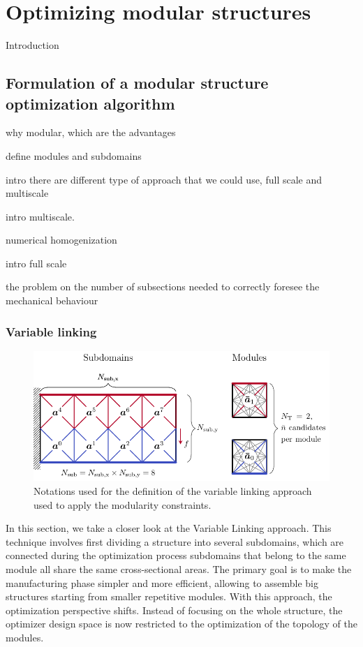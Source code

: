 \setchapterpreamble[u]{\margintoc}
\glsresetall %
\chapter{Optimizing modular structures}
Introduction
\section{Formulation of a modular structure optimization algorithm}
why modular, which are the advantages

define modules and subdomains

intro there are different type of approach that we could use, full scale and multiscale

intro multiscale.

numerical homogenization

intro full scale

the problem on the number of subsections needed to correctly foresee the mechanical behaviour

\subsection{Variable linking}
\begin{figure}
    \centering
    \includegraphics{figures/05_cellular_opt/00_modules_VL_bc/modules_bc.pdf}
    \caption{Notations used for the definition of the variable linking approach used to apply the modularity constraints.}
    \label{fig:05_VL}
\end{figure}

In this section, we take a closer look at the Variable Linking approach. This technique involves first dividing a structure into several subdomains, which are connected during the optimization process \ie subdomains that belong to the same module all share the same cross-sectional areas. The primary goal is to make the manufacturing phase simpler and more efficient, allowing to assemble big structures starting from smaller repetitive modules. With this approach, the optimization perspective shifts. Instead of focusing on the whole structure, the optimizer design space is now restricted to the optimization of the topology of the modules.

